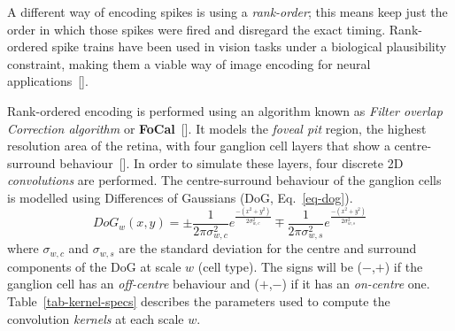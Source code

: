 A different way of encoding spikes is using a \emph{rank-order}; this means
keep just the order in which those spikes were fired and disregard the exact timing. Rank-ordered spike trains have been used in vision tasks under a biological plausibility constraint, making them a viable way of image encoding for neural applications~[\cite{van-rullen-rate-coding,basab-model,Masmoudi2010}].

Rank-ordered encoding is performed using an algorithm known as 
\emph{Filter overlap Correction algorithm} or \textbf{FoCal}~[\cite{basab-model}]. It models the \emph{foveal pit} region, the highest resolution area of the retina, with four ganglion cell layers that show a centre-surround behaviour~[\cite{Kolb2003}]. In order to simulate these layers, four discrete 2D \emph{convolutions} are performed. The centre-surround behaviour of the ganglion cells is modelled using Differences of Gaussians (DoG, Eq.~\ref{eq-dog}). 
\begin{equation}
\label{eq-dog}
DoG_w(x,y) = \pm\frac{1}{2\pi\sigma_{w,c}^2}e^{\frac{-(x^2 + y^2)}{2\sigma_{w,c}^2}}
\mp\frac{1}{2\pi\sigma_{w,s}^2}e^{\frac{-(x^2 + y^2)}{2\sigma_{w,s}^2}}
\end{equation}
where $\sigma_{w,c}$ and $\sigma_{w,s}$ are the standard deviation for the 
centre and surround components of the DoG at scale $w$ (cell type). The signs 
will be ($-$,$+$) if the ganglion cell has an \emph{off-centre} behaviour and 
($+$,$-$) if it has an \emph{on-centre} one. Table~\ref{tab-kernel-specs} 
describes the parameters used to compute the convolution \emph{kernels} at each 
scale $w$.

